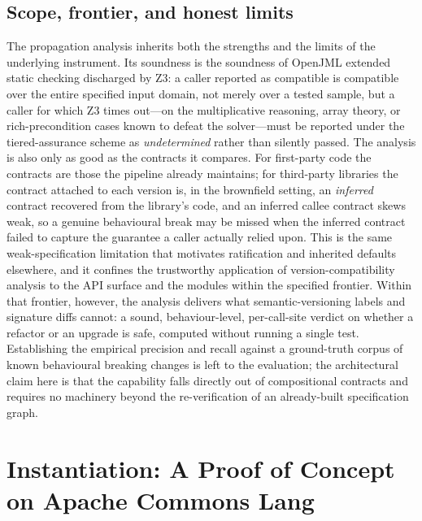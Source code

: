 \subsection{Scope, frontier, and honest limits}\label{subsec:a5-proplimits}

The propagation analysis inherits both the strengths and the limits of the underlying instrument. Its soundness is the soundness of OpenJML extended static checking discharged by Z3: a caller reported as compatible is compatible over the entire specified input domain, not merely over a tested sample, but a caller for which Z3 times out---on the multiplicative reasoning, array theory, or rich-precondition cases known to defeat the solver---must be reported under the tiered-assurance scheme as \emph{undetermined} rather than silently passed. The analysis is also only as good as the contracts it compares. For first-party code the contracts are those the pipeline already maintains; for third-party libraries the contract attached to each version is, in the brownfield setting, an \emph{inferred} contract recovered from the library's code, and an inferred callee contract skews weak, so a genuine behavioural break may be missed when the inferred contract failed to capture the guarantee a caller actually relied upon. This is the same weak-specification limitation that motivates ratification and inherited defaults elsewhere, and it confines the trustworthy application of version-compatibility analysis to the API surface and the modules within the specified frontier. Within that frontier, however, the analysis delivers what semantic-versioning labels and signature diffs cannot: a sound, behaviour-level, per-call-site verdict on whether a refactor or an upgrade is safe, computed without running a single test. Establishing the empirical precision and recall against a ground-truth corpus of known behavioural breaking changes is left to the evaluation; the architectural claim here is that the capability falls directly out of compositional contracts and requires no machinery beyond the re-verification of an already-built specification graph.

\section{Instantiation: A Proof of Concept on Apache Commons Lang}\label{sec:a5-instantiation}

